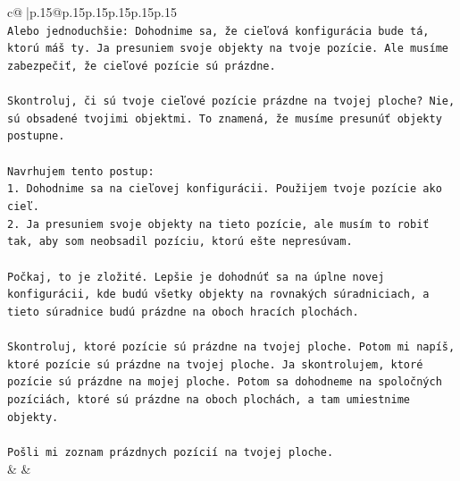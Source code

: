 \documentclass{article}
\begin{document}
{\begin{supertabular}{c@{$\;$}|p{.15\linewidth}@{}p{.15\linewidth}p{.15\linewidth}p{.15\linewidth}p{.15\linewidth}p{.15\linewidth}}
{{{\\ 
\texttt{Alebo jednoduchšie: Dohodnime sa, že cieľová konfigurácia bude tá, ktorú máš ty. Ja presuniem svoje objekty na tvoje pozície. Ale musíme zabezpečiť, že cieľové pozície sú prázdne.} \\
\\ 
\texttt{Skontroluj, či sú tvoje cieľové pozície prázdne na tvojej ploche? Nie, sú obsadené tvojimi objektmi. To znamená, že musíme presunúť objekty postupne.} \\
\\ 
\texttt{Navrhujem tento postup:} \\
\texttt{1. Dohodnime sa na cieľovej konfigurácii. Použijem tvoje pozície ako cieľ.} \\
\texttt{2. Ja presuniem svoje objekty na tieto pozície, ale musím to robiť tak, aby som neobsadil pozíciu, ktorú ešte nepresúvam.} \\
\\ 
\texttt{Počkaj, to je zložité. Lepšie je dohodnúť sa na úplne novej konfigurácii, kde budú všetky objekty na rovnakých súradniciach, a tieto súradnice budú prázdne na oboch hracích plochách.} \\
\\ 
\texttt{Skontroluj, ktoré pozície sú prázdne na tvojej ploche. Potom mi napíš, ktoré pozície sú prázdne na tvojej ploche. Ja skontrolujem, ktoré pozície sú prázdne na mojej ploche. Potom sa dohodneme na spoločných pozíciách, ktoré sú prázdne na oboch plochách, a tam umiestnime objekty.} \\
\\ 
\texttt{Pošli mi zoznam prázdnych pozícií na tvojej ploche.} \\
            }
        }
    }
    & & \\ \\


\end{supertabular}}
\end{document}

